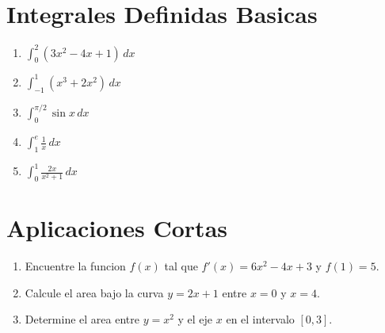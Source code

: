 \documentclass[12pt,a4paper]{article}
\begin{document}
\section{Integrales Definidas Basicas}

\begin{enumerate}
    \item $\int_0^2 (3x^2-4x+1)\,dx$
    \item $\int_{-1}^{1} (x^3+2x^2)\,dx$
    \item $\int_0^{\pi/2} \sin x\,dx$
    \item $\int_1^{e} \frac{1}{x}\,dx$
    \item $\int_0^1 \frac{2x}{x^2+1}\,dx$
\end{enumerate}

\section{Aplicaciones Cortas}

\begin{enumerate}
    \item Encuentre la funcion $f(x)$ tal que $f'(x)=6x^2-4x+3$ y $f(1)=5$.
    \item Calcule el area bajo la curva $y=2x+1$ entre $x=0$ y $x=4$.
    \item Determine el area entre $y=x^2$ y el eje $x$ en el intervalo $[0,3]$.
\end{enumerate}
\end{document}
